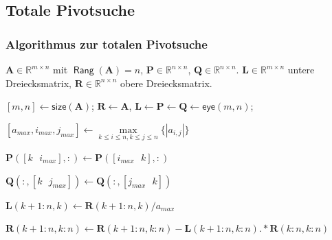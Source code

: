 \documentclass[10pt]{beamer} %
\DeclareMathOperator{\Rang}{\mathsf{Rang}}
\newcommand{\bfA}{{\mathbf A}}
\newcommand{\bfL}{{\mathbf L}}
\newcommand{\bfP}{{\mathbf P}}
\newcommand{\bfQ}{{\mathbf Q}}
\newcommand{\bfR}{{\mathbf R}}
\begin{document}
\subsection{Totale Pivotsuche}
\begin{frame}
  \frametitle{Algorithmus zur totalen Pivotsuche}

  \setcounter{algorithm}{0} %
  \begin{algorithm}[H]
  \caption{Totale Pivotisierung%
    \label{alg:total_pivoting}}
  \begin{algorithmic}[1]

		\REQUIRE $\bfA\in\mathbb{R}^{m\times n}$ mit $\Rang(\bfA)=n$, $\bfP\in\mathbb{R}^{n\times n}$, $\bfQ\in\mathbb{R}^{n\times n}$.
		\ENSURE $\bfL\in\mathbb{R}^{m\times n}$ untere Dreiecksmatrix, $\bfR\in\mathbb{R}^{n\times n}$ obere Dreiecksmatrix.

		\STATE \alert<2>{$[m,n] \leftarrow \textsf{size}(\bfA)$;}
		\STATE \alert<3>{$\bfR \leftarrow \bfA$,} \alert<4>{$\bfL \leftarrow \bfP \leftarrow \bfQ \leftarrow \textsf{eye}(m,n)$;}


			\STATE \alert<5>{$[a_{max},i_{max},j_{max}] \leftarrow \max\limits_{k \leq i \leq n, k \leq j \leq n}\{|a_{i,j}|\}$}

				\STATE \alert<6>{$\bfP([k\textsf{ }i_{max}],:) \leftarrow \bfP([i_{max}\textsf{ }k],:)$}
			\ENDIF

				\STATE \alert<7>{$\bfQ(:,[k\textsf{ }j_{max}]) \leftarrow \bfQ(:,[j_{max}\textsf{ }k])$}
			\ENDIF

			\STATE \alert<8>{$\bfL(k+1:n,k) \leftarrow \bfR(k+1:n,k)/a_{max}$}

			\STATE \alert<9>{$\bfR(k+1:n,k:n) \leftarrow \bfR(k+1:n,k:n) - \bfL(k+1:n,k:n).*\bfR(k:n,k:n)$}

		\ENDFOR
  \end{algorithmic}
\end{algorithm}

\end{frame}
\end{document}
